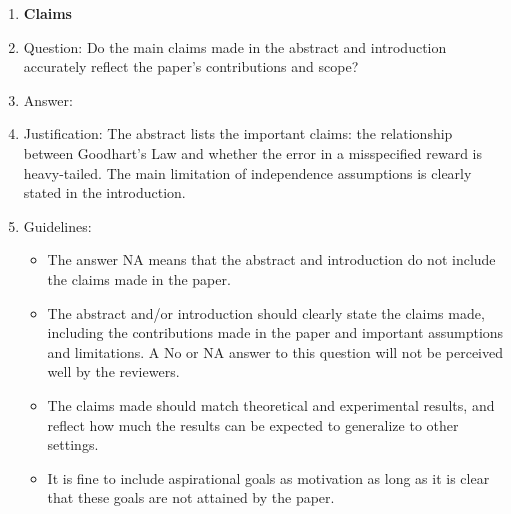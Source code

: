 \documentclass{article}
\begin{document}
\begin{enumerate}

\item {\bf Claims}
    \item[] Question: Do the main claims made in the abstract and introduction accurately reflect the paper's contributions and scope?
    \item[] Answer: \answerYes{} %
    \item[] Justification: The abstract lists the important claims: the relationship between Goodhart's Law and whether the error in a misspecified reward is heavy-tailed. The main limitation of independence assumptions is clearly stated in the introduction.
    \item[] Guidelines:
    \begin{itemize}
        \item The answer NA means that the abstract and introduction do not include the claims made in the paper.
        \item The abstract and/or introduction should clearly state the claims made, including the contributions made in the paper and important assumptions and limitations. A No or NA answer to this question will not be perceived well by the reviewers. 
        \item The claims made should match theoretical and experimental results, and reflect how much the results can be expected to generalize to other settings. 
        \item It is fine to include aspirational goals as motivation as long as it is clear that these goals are not attained by the paper. 
    \end{itemize}


\end{enumerate}
\end{document}

